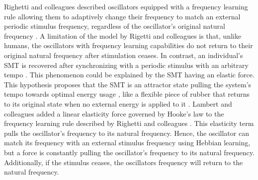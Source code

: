 \documentclass{report}
\begin{document}
Righetti and colleagues described oscillators equipped with a frequency learning rule allowing them to adaptively change their frequency to match an external periodic stimulus frequency, regardless of the oscillator's original natural frequency \cite{righetti2009adaptive}. A limitation of the model by Rigetti and colleagues is that, unlike humans, the oscillators with frequency learning capabilities do not return to their original natural frequency after stimulation ceases. In contrast, an individual's SMT is recovered after synchronizing with a periodic stimulus with an arbitrary tempo \cite{scheurich2018tapping}. This phenomenon could be explained by the SMT having an elastic force. This hypothesis proposes that the SMT is an attractor state pulling the system's tempo towards optimal energy usage \cite{mcauley2006time, scheurich2018tapping}, like a flexible piece of rubber that returns to its original state when no external energy is applied to it \cite{strogatz1993coupled}. Lambert and colleagues added a linear elasticity force governed by Hooke's law to the frequency learning rule described by Righetti and colleagues \cite{lambert2016adaptive}. This elasticity term pulls the oscillator's frequency to its natural frequency. Hence, the oscillator can match its frequency with an external stimulus frequency using Hebbian learning, but a force is constantly pulling the oscillator's frequency to its natural frequency. Additionally, if the stimulus ceases, the oscillators frequency will return to the natural frequency.
\end{document}
